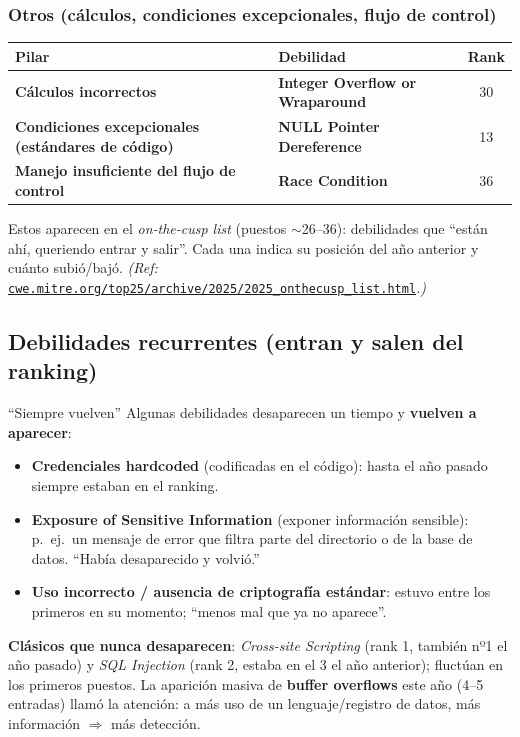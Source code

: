 \documentclass[11pt,a4paper]{article}
\begin{document}
\subsubsection{Otros (cálculos, condiciones excepcionales, flujo de control)}
\begin{center}
\renewcommand{\arraystretch}{1.25}
\begin{tabular}{>{\bfseries}p{4.6cm} >{\bfseries}p{5.5cm} c}
\toprule
Pilar & Debilidad & Rank \\
\midrule
Cálculos incorrectos & Integer Overflow or Wraparound & 30 \\
Condiciones excepcionales (estándares de código) & NULL Pointer Dereference & 13 \\
Manejo insuficiente del flujo de control & Race Condition & 36 \\
\bottomrule
\end{tabular}
\end{center}
Estos aparecen en el \emph{on-the-cusp list} (puestos $\sim$26--36): debilidades que ``están ahí,
queriendo entrar y salir''. Cada una indica su posición del año anterior y cuánto subió/bajó.
\emph{(Ref:} \href{https://cwe.mitre.org/top25/archive/2025/2025_onthecusp_list.html}{\texttt{cwe.mitre.org/top25/archive/2025/2025\_onthecusp\_list.html}}\emph{.)}

\subsection{Debilidades recurrentes (entran y salen del ranking)}
\begin{warnbox}{``Siempre vuelven''}
Algunas debilidades desaparecen un tiempo y \textbf{vuelven a aparecer}:
\begin{itemize}[leftmargin=1.4em,itemsep=1pt]
  \item \textbf{Credenciales hardcoded} (codificadas en el código): hasta el año pasado siempre
        estaban en el ranking.
  \item \textbf{Exposure of Sensitive Information} (exponer información sensible): p.\ ej.\ un
        mensaje de error que filtra parte del directorio o de la base de datos. ``Había
        desaparecido y volvió.''
  \item \textbf{Uso incorrecto / ausencia de criptografía estándar}: estuvo entre los primeros en
        su momento; ``menos mal que ya no aparece''.
\end{itemize}
\textbf{Clásicos que nunca desaparecen}: \emph{Cross-site Scripting} (rank 1, también nº1 el año
pasado) y \emph{SQL Injection} (rank 2, estaba en el 3 el año anterior); fluctúan en los primeros
puestos. La aparición masiva de \textbf{buffer overflows} este año (4--5 entradas) llamó la
atención: a más uso de un lenguaje/registro de datos, más información $\Rightarrow$ más detección.
\end{warnbox}
\end{document}
